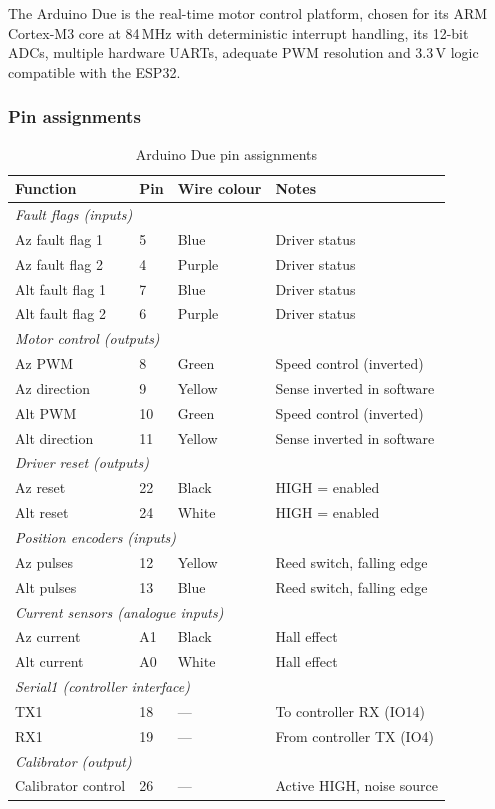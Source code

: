 \documentclass[11pt,a4paper]{article}
\begin{document}
The Arduino Due is the real-time motor control platform, chosen for its ARM Cortex-M3 core at 84\,MHz with deterministic interrupt handling, its 12-bit ADCs, multiple hardware UARTs, adequate PWM resolution and 3.3\,V logic compatible with the ESP32.

\subsubsection{Pin assignments}

\begin{table}[H]
\centering
\caption{Arduino Due pin assignments}
\label{tab:due-pins}
\begin{tabular}{llll}
\toprule
\textbf{Function} & \textbf{Pin} & \textbf{Wire colour} & \textbf{Notes} \\
\midrule
\multicolumn{4}{l}{\textit{Fault flags (inputs)}} \\
Az fault flag 1 & 5 & Blue & Driver status \\
Az fault flag 2 & 4 & Purple & Driver status \\
Alt fault flag 1 & 7 & Blue & Driver status \\
Alt fault flag 2 & 6 & Purple & Driver status \\
\midrule
\multicolumn{4}{l}{\textit{Motor control (outputs)}} \\
Az PWM & 8 & Green & Speed control (inverted) \\
Az direction & 9 & Yellow & Sense inverted in software \\
Alt PWM & 10 & Green & Speed control (inverted) \\
Alt direction & 11 & Yellow & Sense inverted in software \\
\midrule
\multicolumn{4}{l}{\textit{Driver reset (outputs)}} \\
Az reset & 22 & Black & HIGH = enabled \\
Alt reset & 24 & White & HIGH = enabled \\
\midrule
\multicolumn{4}{l}{\textit{Position encoders (inputs)}} \\
Az pulses & 12 & Yellow & Reed switch, falling edge \\
Alt pulses & 13 & Blue & Reed switch, falling edge \\
\midrule
\multicolumn{4}{l}{\textit{Current sensors (analogue inputs)}} \\
Az current & A1 & Black & Hall effect \\
Alt current & A0 & White & Hall effect \\
\midrule
\multicolumn{4}{l}{\textit{Serial1 (controller interface)}} \\
TX1 & 18 & --- & To controller RX (IO14) \\
RX1 & 19 & --- & From controller TX (IO4) \\
\midrule
\multicolumn{4}{l}{\textit{Calibrator (output)}} \\
Calibrator control & 26 & --- & Active HIGH, noise source \\
\bottomrule
\end{tabular}
\end{table}
\end{document}
